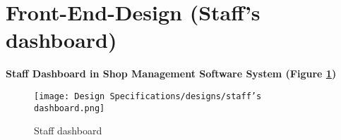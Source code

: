 \section{Front-End-Design (Staff's dashboard)}
\vspace{2cm}
\textbf{Staff Dashboard in Shop Management Software System (Figure \ref{fig:fig 5.12})}\\

\begin{figure}[ht]
    \centering  
    \texttt{[image: Design Specifications/designs/staff's dashboard.png]}    
    \caption{Staff dashboard}
    \label{fig:fig 5.12}
\end{figure}